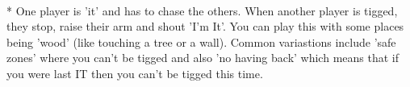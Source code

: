\begin{minipage}{\textwidth}
\\*
One player is 'it' and has to chase the others.  When another player is tigged, they stop, raise their arm
and shout 'I'm It'. You can play this with some places being 'wood' (like touching a tree or a wall).  Common variastions include 'safe zones' where you can't be tigged and also 'no having back' which means that if you were last IT then you can't be tigged this time.
\end{minipage}    \vfill

